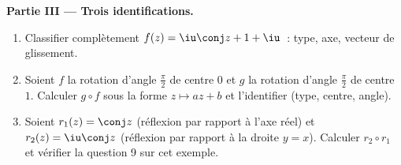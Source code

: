 \begin{problem}
\medskip
\noindent\textbf{Partie III --- Trois identifications.}
\begin{enumerate}[resume]
  \item Classifier complètement $f(z) = \iu\conj z + 1 + \iu$~:
        type, axe, vecteur de glissement.
  \item Soient $f$ la rotation d'angle $\frac\pi2$ de centre $0$
        et $g$ la rotation d'angle $\frac\pi2$ de centre $1$.
        Calculer $g \circ f$ sous la forme $z \mapsto az + b$ et
        l'identifier (type, centre, angle).
  \item Soient $r_1(z) = \conj z$ (réflexion par rapport à l'axe
        réel) et $r_2(z) = \iu\conj z$ (réflexion par rapport à la
        droite $y = x$). Calculer $r_2 \circ r_1$ et vérifier la
        question 9 sur cet exemple.
\end{enumerate}


\end{problem}
